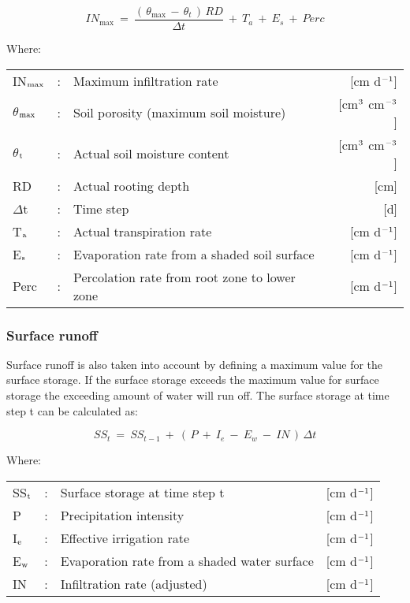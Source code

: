 \begin{equation}
IN_{\max } ~=~{\frac{(\, \theta  _{\max } \, -\, \theta  _{t} \, )\, RD}{\Delta t}} ~+~ T _{a} ~+~ E _{s} ~+~ Perc
\end{equation}

Where:\\
\begin{tabularx}{\textwidth}{llXr}
IN$_{{\rm max}}$ &:& Maximum infiltration rate  & [cm d$^{{\rm -1}}$]\\
$\theta$$_{{\rm max}}$ &:& Soil porosity (maximum soil moisture)  & [cm$^{{\rm 3}}$ cm$^{{\rm -3}}$]\\
$\theta$$_{{\rm t}}$ &:& Actual soil moisture content  & [cm$^{{\rm 3}}$ cm$^{{\rm -3}}$]\\
RD &:& Actual rooting depth  & [cm]\\
$\Delta$t &:& Time step  & [d]\\
T$_{{\rm a}}$ &:& Actual transpiration rate   & [cm d$^{{\rm -1}}$]\\
E$_{{\rm s}}$ &:& Evaporation rate from a shaded soil surface  & [cm d$^{{\rm -1}}$]\\
Perc &:& Percolation rate from root zone to lower zone  & [cm d$^{{\rm -1}}$]\\
\end{tabularx}

\subsubsection{Surface runoff}

Surface runoff is also taken into account by defining a maximum value for the surface
storage. If the surface storage exceeds the maximum value for surface storage the
exceeding amount of water will run off. The surface storage at time step t can be
calculated as:

\begin{equation}
SS_{t} ~=~ SS _{t-1} ~+~ (\, P ~+~ I _{e} ~-~ E _{w} ~-~ IN\, )\, \Delta t
\end{equation}

Where:\\
\begin{tabularx}{\textwidth}{llXr}
SS$_{{\rm t}}$ &:& Surface storage at time step t  & [cm d$^{{\rm -1}}$]\\
P &:& Precipitation intensity  & [cm d$^{{\rm -1}}$]\\
I$_{{\rm e}}$ &:& Effective irrigation rate  & [cm d$^{{\rm -1}}$]\\
E$_{{\rm w}}$ &:& Evaporation rate from a shaded water surface  & [cm d$^{{\rm -1}}$]\\
IN &:& Infiltration rate (adjusted)  & [cm d$^{{\rm -1}}$]\\
\end{tabularx}

